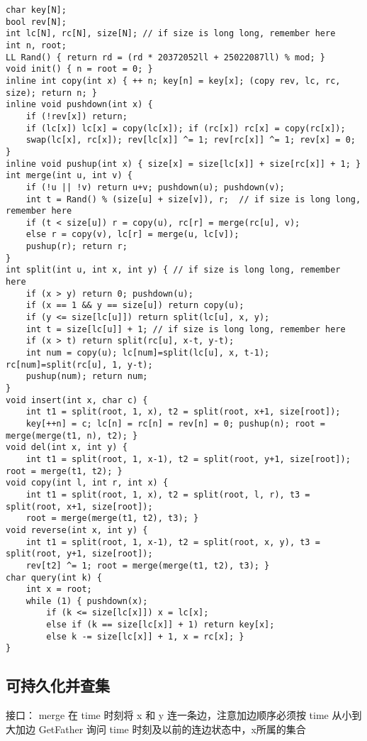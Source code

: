 \documentclass[landscape,a4paper]{article}
\begin{document}
\begin{lstlisting}
char key[N];
bool rev[N];
int lc[N], rc[N], size[N]; // if size is long long, remember here
int n, root;
LL Rand() { return rd = (rd * 20372052ll + 25022087ll) % mod; }
void init() { n = root = 0; }
inline int copy(int x) { ++ n; key[n] = key[x]; (copy rev, lc, rc, size); return n; }
inline void pushdown(int x) {
	if (!rev[x]) return;
	if (lc[x]) lc[x] = copy(lc[x]); if (rc[x]) rc[x] = copy(rc[x]);
	swap(lc[x], rc[x]); rev[lc[x]] ^= 1; rev[rc[x]] ^= 1; rev[x] = 0;
}
inline void pushup(int x) { size[x] = size[lc[x]] + size[rc[x]] + 1; }
int merge(int u, int v) {
	if (!u || !v) return u+v; pushdown(u); pushdown(v);
	int t = Rand() % (size[u] + size[v]), r;  // if size is long long, remember here
	if (t < size[u]) r = copy(u), rc[r] = merge(rc[u], v);
	else r = copy(v), lc[r] = merge(u, lc[v]);
	pushup(r); return r;
}
int split(int u, int x, int y) { // if size is long long, remember here
	if (x > y) return 0; pushdown(u);
	if (x == 1 && y == size[u]) return copy(u);
	if (y <= size[lc[u]]) return split(lc[u], x, y);
	int t = size[lc[u]] + 1; // if size is long long, remember here
	if (x > t) return split(rc[u], x-t, y-t);
	int num = copy(u); lc[num]=split(lc[u], x, t-1); rc[num]=split(rc[u], 1, y-t);
	pushup(num); return num;
}
void insert(int x, char c) {
	int t1 = split(root, 1, x), t2 = split(root, x+1, size[root]);
	key[++n] = c; lc[n] = rc[n] = rev[n] = 0; pushup(n); root = merge(merge(t1, n), t2); }
void del(int x, int y) {
	int t1 = split(root, 1, x-1), t2 = split(root, y+1, size[root]); root = merge(t1, t2); }
void copy(int l, int r, int x) {
	int t1 = split(root, 1, x), t2 = split(root, l, r), t3 = split(root, x+1, size[root]);
	root = merge(merge(t1, t2), t3); }
void reverse(int x, int y) {
	int t1 = split(root, 1, x-1), t2 = split(root, x, y), t3 = split(root, y+1, size[root]);
	rev[t2] ^= 1; root = merge(merge(t1, t2), t3); }
char query(int k) {
	int x = root;
	while (1) {	pushdown(x);
		if (k <= size[lc[x]]) x = lc[x];
		else if (k == size[lc[x]] + 1) return key[x];
		else k -= size[lc[x]] + 1, x = rc[x]; }
}
\end{lstlisting}
\subsection{可持久化并查集}

接口：
 merge 在 time 时刻将 x 和 y 连一条边，注意加边顺序必须按 time 从小到大加边
 GetFather 询问 time 时刻及以前的连边状态中，x所属的集合
\end{document}
